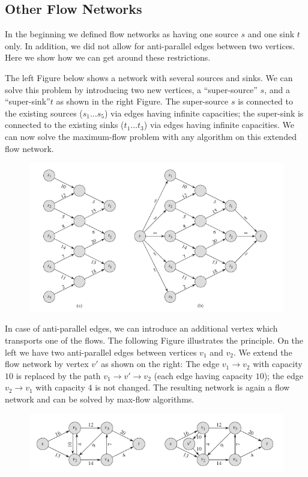 
\subsection{Other Flow Networks}

In the beginning we defined flow networks as having one source $s$ and one sink $t$ only. In addition, we did not allow for anti-parallel edges between two vertices. Here we show how we can get around these restrictions.

The left Figure below shows a network with several sources and sinks. We can solve this problem by introducing two new vertices, a ``super-source'' $s$, and a ``super-sink''$t$ as shown in the right Figure. The super-source $s$ is connected to the existing sources ($s_1 \ldots s_5$) via edges having infinite capacities; the super-sink is connected to the existing sinks ($t_1 \ldots t_3$) via edges having infinite capacities. We can now solve the maximum-flow problem with any algorithm on this extended flow network.

\begin{figure}[H]
\centering
\includegraphics[scale=0.65]{images/max_flow_04_01.png}
\end{figure}

In case of anti-parallel edges, we can introduce an additional vertex which transports one of the flows. The following Figure illustrates the principle. On the left we have two anti-parallel edges between vertices $v_1$ and $v_2$. We extend the flow network by vertex $v'$ as shown on the right: The edge $v_1 \rightarrow v_2$ with capacity $10$ is replaced by the path $v_1 \rightarrow v' \rightarrow v_2$ (each edge having capacity $10$); the edge $v_2 \rightarrow v_1$ with capacity $4$ is not changed. The resulting network is again a flow network and can be solved by max-flow algorithms.

\begin{figure}[H]
\centering
\includegraphics[scale=0.65]{images/max_flow_04_02.png}
\end{figure}



